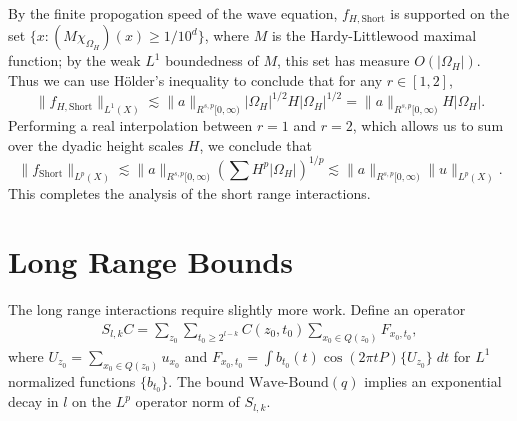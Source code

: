 %
By the finite propogation speed of the wave equation, $f_{H,\text{Short}}$ is supported on the set $\{ x: (M \chi_{\Omega_H})(x) \geq 1/10^d \}$, where $M$ is the Hardy-Littlewood maximal function; by the weak $L^1$ boundedness of $M$, this set has measure $O(|\Omega_H|)$. Thus we can use H\"{o}lder's inequality to conclude that for any $r \in [1,2]$,
%
\begin{equation}
    \| f_{H,\text{Short}} \|_{L^1(X)} \lesssim \| a \|_{R^{s,p}[0,\infty)} |\Omega_H|^{1/2} H |\Omega_H|^{1/2} = \| a \|_{R^{s,p}[0,\infty)} H |\Omega_H|.
\end{equation}
%
Performing a real interpolation between $r = 1$ and $r = 2$, which allows us to sum over the dyadic height scales $H$, we conclude that
%
\begin{equation}
    \| f_{\text{Short}} \|_{L^p(X)} \lesssim  \| a \|_{R^{s,p}[0,\infty)} \left( \sum H^p |\Omega_H| \right)^{1/p} \lesssim \| a \|_{R^{s,p}[0,\infty)} \| u \|_{L^p(X)}.
\end{equation}
%
This completes the analysis of the short range interactions.

\section{Long Range Bounds}

The long range interactions require slightly more work. Define an operator
%
\begin{equation}
\begin{split}
    S_{l,k} C = \sum\nolimits_{z_0} \sum\nolimits_{t_0 \geq 2^{l-k}} C(z_0,t_0) \sum\nolimits_{x_0 \in Q(z_0)} F_{x_0,t_0},
\end{split}
\end{equation}
%
where $U_{z_0} = \sum_{x_0 \in Q(z_0)} u_{x_0}$ and $F_{x_0,t_0} = \int b_{t_0}(t) \cos(2 \pi t P) \{ U_{z_0} \}\; dt$ for $L^1$ normalized functions $\{ b_{t_0} \}$. The bound $\text{Wave-Bound}(q)$ implies an exponential decay in $l$ on the $L^p$ operator norm of $S_{l,k}$.

